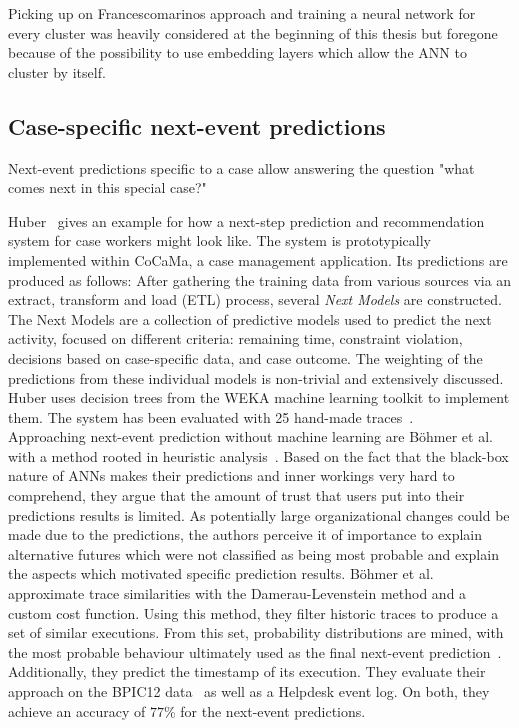 Picking up on Francescomarinos approach and training a neural network for every cluster was heavily considered at the beginning of this thesis but foregone because of the possibility to use embedding layers which allow the ANN to cluster by itself.

\subsection*{Case-specific next-event predictions}
Next-event predictions specific to a case allow answering the question "what comes next in this special case?"

Huber~\cite{hauder2014} gives an example for how a next-step prediction and recommendation system for case workers might look like. The system is prototypically implemented within CoCaMa, a case management application. Its predictions are produced as follows: After gathering the training data from various sources via an extract, transform and load (ETL) process, several \textit{Next Models} are constructed. The Next Models are a collection of predictive models used to predict the next activity, focused on different criteria: remaining time, constraint violation, decisions based on case-specific data, and case outcome. The weighting of the predictions from these individual models is non-trivial and extensively discussed. Huber uses decision trees from the WEKA \cite{web:weka} machine learning toolkit to implement them. The system has been evaluated with 25 hand-made traces~\cite{huber2015}.\\

Approaching next-event prediction without machine learning are Böhmer et al. with a method rooted in heuristic analysis~\cite{boehmer2018probability}. Based on the fact that the black-box nature of ANNs makes their predictions and inner workings very hard to comprehend, they argue that the amount of trust that users put into their predictions results is limited. As potentially large organizational changes could be made due to the predictions, the authors perceive it of importance to explain alternative futures which were not classified as being most probable and explain the aspects which motivated specific prediction results.
Böhmer et al. approximate trace similarities with the Damerau-Levenstein method and a custom cost function. Using this method, they filter historic traces to produce a set of similar executions. From this set, probability distributions are mined, with the most probable behaviour ultimately used as the final next-event prediction~\cite{boehmer2018probability}. Additionally, they predict the timestamp of its execution. They evaluate their approach on the BPIC12 data~\cite{BPIC2012} as well as a Helpdesk event log. On both, they achieve an accuracy of $77\%$ for the next-event predictions.\\

